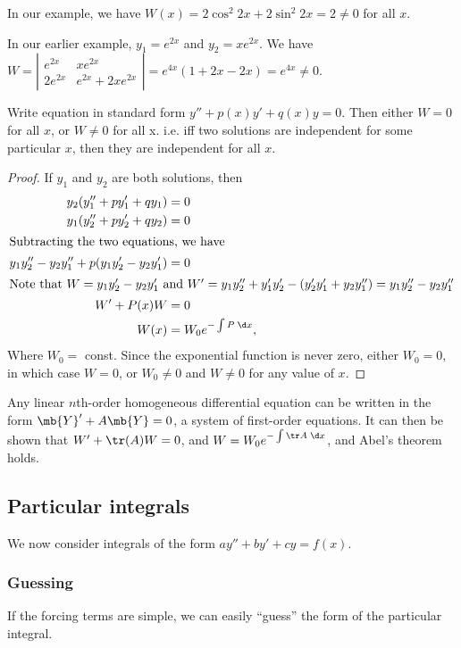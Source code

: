 \documentclass[a4paper]{article}
\begin{document}
In our example, we have $W(x) = 2\cos^2 2x + 2\sin^2 2x = 2 \not= 0$ for all $x$.

\begin{eg}
  In our earlier example, $y_1 = e^{2x}$ and $y_2 = xe^{2x}$. We have $W = \left|\begin{matrix} e^{2x} & xe^{2x}\\ 2e^{2x} & e^{2x} + 2xe^{2x} \end{matrix}\right| = e^{4x}(1 + 2x - 2x) = e^{4x} \not= 0$.
\end{eg}

\begin{thm}
  Write equation in standard form $y'' + p(x)y' + q(x) y = 0$. Then either $W = 0$ for all $x$, or $W \not= 0$ for all x. i.e. iff two solutions are independent for some particular $x$, then they are independent for all $x$.
\end{thm}

\begin{proof}
  If $y_1$ and $y_2$ are both solutions, then 
  \begin{align*}
    y_2(y_1'' + py_1' + qy_1) &= 0\\
    y_1(y_2'' + py_2' + qy_2) &= 0\\
    \intertext{Subtracting the two equations, we have}
    y_1y_2'' - y_2y_1'' + p(y_1y_2' - y_2y_1') &= 0\\
    \intertext{Note that $W =y_1y_2' - y_2y_1'$ and $W' = y_1y_2'' + y_1'y_2' - (y_2'y_1' + y_2y_1'') = y_1y_2'' - y_2y_1''$}
    W' + P(x)W &= 0\\
    W(x) &= W_0 e^{-\int P\; \d x},
  \end{align*}
  Where $W_0 = $ const. Since the exponential function is never zero, either $W_0 = 0$, in which case $W = 0$, or $W_0 \not= 0$ and $W \not= 0$ for any value of $x$.
\end{proof}
\note Any linear $n$th-order homogeneous differential equation can be written in the form $\mb{Y}' + A\mb{Y} = 0$, a system of first-order equations. It can then be shown that $W' + \tr(A)W = 0$, and $W = W_0e^{-\int \tr A\;\d x}$, and Abel's theorem holds.

\subsection{Particular integrals}
We now consider integrals of the form $ay'' + by' + cy = f(x)$.

\subsubsection{Guessing}
If the forcing terms are simple, we can easily ``guess'' the form of the particular integral.
\end{document}
